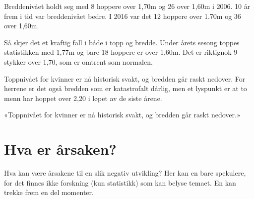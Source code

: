 Breddenivået holdt seg med 8 hoppere over 1,70m og 26 over 1,60m i 2006. 10 år frem i tid var breddenivået bedre. I 2016 var det 12 hoppere over 1.70m og 36 over 1,60m.

Så skjer det et kraftig fall i både i topp og bredde. Under årets sesong toppes statistikken med 1,77m og bare 18 hoppere er over 1,60m. Det er riktignok 9 stykker over 1,70, som er omtrent som normalen.

Toppnivået for kvinner er nå historisk svakt, og bredden går raskt nedover. For herrene er det også bredden som er katastrofalt dårlig, men et lyspunkt er at to menn har hoppet over 2,20 i løpet av de siste årene.

\begin{sitat}

«Toppnivået for kvinner er nå historisk svakt, og bredden går raskt nedover.»

\end{sitat}

\section{Hva er årsaken?}\label{hva-er-uxe5rsaken}

Hva kan være årsakene til en slik negativ utvikling? Her kan en bare spekulere, for det finnes ikke forskning (kun statistikk) som kan belyse temaet. En kan trekke frem en del momenter.

